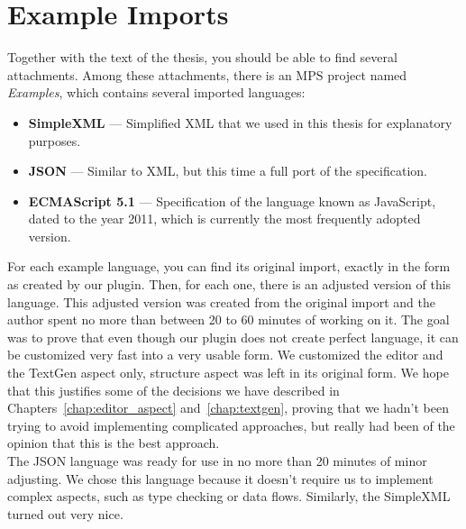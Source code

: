 \chapter{Example Imports}
\label{chap:examples}

Together with the text of the thesis, you should be able to find several attachments.
Among these attachments, there is an MPS project named \textit{Examples}, which contains several imported languages:

\begin{itemize}
	\item \textbf{SimpleXML} --- Simplified XML that we used in this thesis for explanatory purposes.

	\item \textbf{JSON} --- Similar to XML, but this time a full port of the specification.

	\item \textbf{ECMAScript 5.1} --- Specification of the language known as JavaScript, dated to the year 2011, which is currently the most frequently adopted version.
\end{itemize}

For each example language, you can find its original import, exactly in the form as created by our plugin.
Then, for each one, there is an adjusted version of this language.
This adjusted version was created from the original import and the author spent no more than between 20 to 60 minutes of working on it.
The goal was to prove that even though our plugin does not create perfect language, it can be customized very fast into a very usable form.
We customized the editor and the TextGen aspect only, structure aspect was left in its original form.
We hope that this justifies some of the decisions we have described in Chapters~\ref{chap:editor_aspect} and~\ref{chap:textgen}, proving that we hadn't been trying to avoid implementing complicated approaches, but really had been of the opinion that this is the best approach.
\\

The JSON language was ready for use in no more than 20 minutes of minor adjusting.
We chose this language because it doesn't require us to implement complex aspects, such as type checking or data flows.
Similarly, the SimpleXML turned out very nice.
\\

